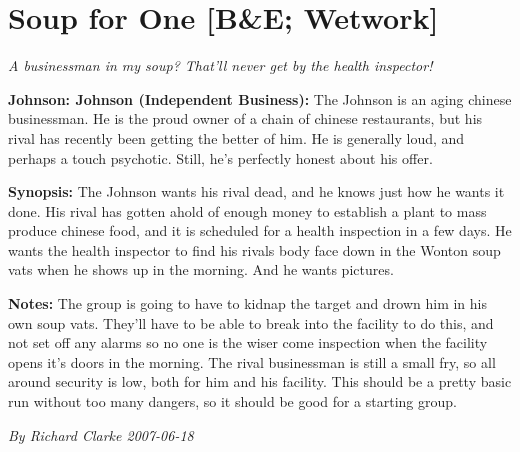 \documentclass[letterpaper,twocolumn,10.5pt]{article}
\newenvironment{scenario}[6]
	{
		\section{#1 {\small[#2]}}
		\textit{#3}
		\def\TMPSCENARIO{#4 #5}
	}
	{\small\textit{By \TMPSCENARIO}}
\newcommand{\johnson}[2]{\textbf{Johnson: #1 (#2):}}
\newcommand{\synopsis}{\textbf{Synopsis: }}
\newcommand{\notes}{\textbf{Notes: }}
\begin{document}
\begin{scenario}{Soup for One}
	{B\&E; Wetwork}
	{ A businessman in my soup? That'll never get by the health inspector!}
	{Richard Clarke}
	{2007-06-18}
	{https://forum.rpg.net/showthread.php?321504-Shadowrun-4th-101-Instant-Scenarios\&p=7439064#post7439064}

\johnson{Johnson}{Independent Business}  The Johnson is an aging chinese businessman. He is the proud owner of a chain of chinese restaurants, but his rival has recently been getting the better of him. He is generally loud, and perhaps a touch psychotic. Still, he's perfectly honest about his offer.

\synopsis The Johnson wants his rival dead, and he knows just how he wants it done. His rival has gotten ahold of enough money to establish a plant to mass produce chinese food, and it is scheduled for a health inspection in a few days. He wants the health inspector to find his rivals body face down in the Wonton soup vats when he shows up in the morning. And he wants pictures. 

\notes The group is going to have to kidnap the target and drown him in his own soup vats. They'll have to be able to break into the facility to do this, and not set off any alarms so no one is the wiser come inspection when the facility opens it's doors in the morning. The rival businessman is still a small fry, so all around security is low, both for him and his facility. This should be a pretty basic run without too many dangers, so it should be good for a starting group. 

\end{scenario}
\end{document}
